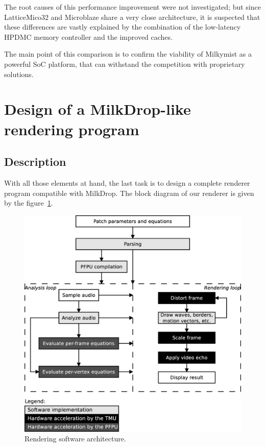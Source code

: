 \documentclass[a4paper,11pt]{kthesis}
\begin{document}
The root causes of this performance improvement were not investigated; but since LatticeMico32 and Microblaze share a very close architecture, it is suspected that these differences are vastly explained by the combination of the low-latency HPDMC memory controller and the improved caches.

The main point of this comparison is to confirm the viability of Milkymist as a powerful SoC platform, that can withstand the competition with proprietary solutions.

\section{Design of a MilkDrop-like rendering program}
\subsection{Description}
With all those elements at hand, the last task is to design a complete renderer program compatible with MilkDrop. The block diagram of our renderer is given by the figure~\ref{fig:swarch}.

\begin{figure}[htp]
\centering
\includegraphics[width=\textwidth]{swarch.eps}
\caption{Rendering software architecture.}
\label{fig:swarch}
\end{figure}
\end{document}
